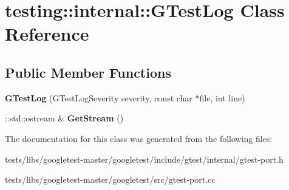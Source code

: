 \hypertarget{classtesting_1_1internal_1_1GTestLog}{}\section{testing\+:\+:internal\+:\+:G\+Test\+Log Class Reference}
\label{classtesting_1_1internal_1_1GTestLog}
\subsection*{Public Member Functions}
\begin{DoxyCompactItemize}
\item 
\mbox{\label{classtesting_1_1internal_1_1GTestLog_a364691bf972983a59cfa2891062a64af}} 
{\bfseries G\+Test\+Log} (G\+Test\+Log\+Severity severity, const char $\ast$file, int line)
\item 
\mbox{\label{classtesting_1_1internal_1_1GTestLog_aebb92e67d98eca69f0347d5121dab27a}} 
\+::std\+::ostream \& {\bfseries Get\+Stream} ()
\end{DoxyCompactItemize}


The documentation for this class was generated from the following files\+:\begin{DoxyCompactItemize}
\item 
tests/libs/googletest-\/master/googletest/include/gtest/internal/gtest-\/port.\+h\item 
tests/libs/googletest-\/master/googletest/src/gtest-\/port.\+cc\end{DoxyCompactItemize}
